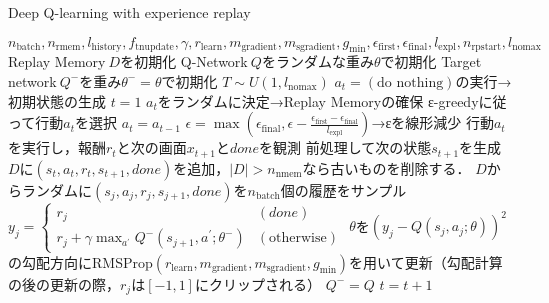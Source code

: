\documentclass{jarticle}
\begin{document}
\begin{algorithm}[tb]
\caption{Deep Q-learning with experience replay}
\label{alg:dqn}                          
\begin{algorithmic}[1]   
\REQUIRE $n_{\mathrm{batch}},n_{\mathrm{rmem}},l_{\mathrm{history}},f_{\mathrm{tnupdate}},\gamma,r_{\mathrm{learn}},m_{\mathrm{gradient}},m_{\mathrm{sgradient}},g_{\mathrm{min}},\epsilon_{\mathrm{first}},\epsilon_{\mathrm{final}},l_{\mathrm{expl}},n_{\mathrm{rpstart}},l_{\mathrm{nomax}}$
\STATE Replay Memory$~D$を初期化
\STATE Q-Network$~Q$をランダムな重み$\theta$で初期化
\STATE Target network$~Q^-$を重み$\theta^-=\theta$で初期化
\STATE $T\sim U(1,l_{\mathrm{nomax}})$
\STATE $a_t=(\mbox{do nothing})$の実行→初期状態の生成
\ENDFOR
\STATE $t=1$
\STATE $a_t$をランダムに決定→Replay Memoryの確保
\ELSE
{}
\STATE ε-greedyに従って行動$a_t$を選択
\ELSE
\STATE $a_t=a_{t-1}$
\ENDIF
\STATE $\epsilon=\max{(\epsilon_{\mathrm{final}},\epsilon-\frac{\epsilon_{\mathrm{first}}-\epsilon_{\mathrm{final}}}{l_{\mathrm{expl}}})}$→εを線形減少
\ENDIF
\STATE 行動$a_t$を実行し，報酬$r_t$と次の画面$x_{t+1}$と$done$を観測
\STATE 前処理して次の状態$s_{t+1}$を生成
\STATE $D$に$(s_t,a_t,r_t,s_{t+1},done)$を追加，$|D|>n_{\mathrm{nmem}}$なら古いものを削除する．
\STATE $D$からランダムに$(s_j,a_j,r_j,s_{j+1},done)$を$n_{\mathrm{batch}}$個の履歴をサンプル
\STATE $y_j=
\begin{cases}
r_j & (done) \\
r_j+\gamma\max_{a^{\prime}}Q^-(s_{j+1},a^{\prime};\theta^-) & (\mbox{otherwise})
\end{cases}$
\STATE $\theta$を$(y_j-Q(s_j,a_j;\theta))^2$の勾配方向にRMSProp$(r_{\mathrm{learn}},m_{\mathrm{gradient}},m_{\mathrm{sgradient}},g_{\mathrm{min}})$を用いて更新（勾配計算の後の更新の際，$r_j$は$[-1,1]$にクリップされる）
\ENDIF
{}
\STATE $Q^-=Q$
\ENDIF
\ENDIF
\STATE $t=t+1$
\ENDWHILE
\ENDFOR
\end{algorithmic}
\end{algorithm}
\end{document}
